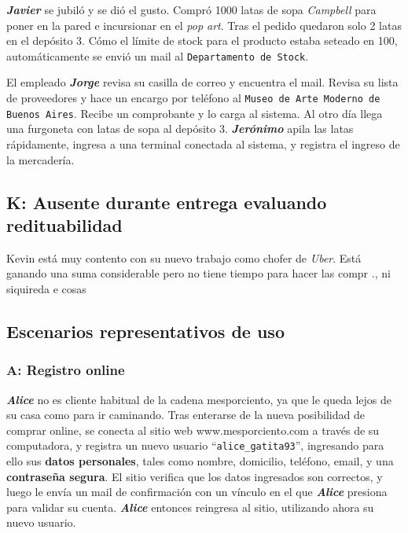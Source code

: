 \textbf{\emph{Javier}} se jubiló y se dió el gusto. Compró 1000 latas de sopa
\textit{Campbell} para poner en la pared e incursionar en el \textit{pop art}.
Tras el pedido quedaron solo 2 latas en el depósito 3. Cómo el límite de stock
para el producto estaba seteado en 100, automáticamente se envió un mail al
\texttt{Departamento de Stock}.

El empleado \textbf{\emph{Jorge}} revisa su casilla de correo y encuentra el
mail. Revisa su lista de proveedores y hace un encargo por teléfono al
\texttt{Museo de Arte Moderno de Buenos Aires}. Recibe un comprobante y lo
carga al sistema. Al otro día llega una furgoneta con latas de sopa al
depósito 3. \textbf{\emph{Jerónimo}} apila las latas rápidamente, ingresa a
una terminal conectada al sistema, y registra el ingreso de la mercadería.

\subsection{K: Ausente durante entrega evaluando redituabilidad}

Kevin está muy contento con su nuevo trabajo como chofer de \textit{Uber}. Está
ganando una suma considerable pero no tiene tiempo para hacer las compr
., ni
siquireda e cosas

\newpage
\subsection{Escenarios representativos de uso}

\subsubsection{A: Registro online}

\textbf{\emph{Alice}} no es cliente habitual de la cadena mesporciento, ya que
le queda lejos de su casa como para ir caminando. Tras enterarse de la nueva
posibilidad de comprar online, se conecta al sitio web www.mesporciento.com a
través de su computadora, y registra un nuevo usuario
``\texttt{alice\_gatita93}'', ingresando para ello sus \textbf{datos
personales}, tales como nombre, domicilio, teléfono, email, y una
\textbf{contraseña segura}. El sitio verifica que los datos ingresados son
correctos, y luego le envía un mail de confirmación con un vínculo en el que
\textbf{\emph{Alice}} presiona para validar su cuenta. \textbf{\emph{Alice}}
entonces reingresa al sitio, utilizando ahora su nuevo usuario.

